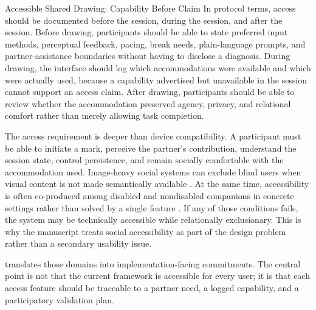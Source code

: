 \documentclass[
  ignorenonframetext,
]{beamer}
\begin{document}
\begin{frame}{Accessible Shared Drawing:
Capability Before Claim}
In protocol terms, access should be documented before the session,
during the session, and after the session. Before drawing, participants
should be able to state preferred input methods, perceptual feedback,
pacing, break needs, plain-language prompts, and partner-assistance
boundaries without having to disclose a diagnosis. During drawing, the
interface should log which accommodations were available and which were
actually used, because a capability advertised but unavailable in the
session cannot support an access claim. After drawing, participants
should be able to review whether the accommodation preserved agency,
privacy, and relational comfort rather than merely allowing task
completion.

The access requirement is deeper than device compatibility. A
participant must be able to initiate a mark, perceive the partner's
contribution, understand the session state, control persistence, and
remain socially comfortable with the accommodation used. Image-heavy
social systems can exclude blind users when visual content is not made
semantically available . At the same time,
accessibility is often co-produced among disabled and nondisabled
companions in concrete settings rather than solved by a single feature
. If any of those conditions fails,
the system may be technically accessible while relationally
exclusionary. This is why the manuscript treats social accessibility as
part of the design problem rather than a secondary usability issue.

 translates those domains
into implementation-facing commitments. The central point is not that
the current framework is accessible for every user; it is that each
access feature should be traceable to a partner need, a logged
capability, and a participatory validation plan.


\end{frame}
\end{document}
